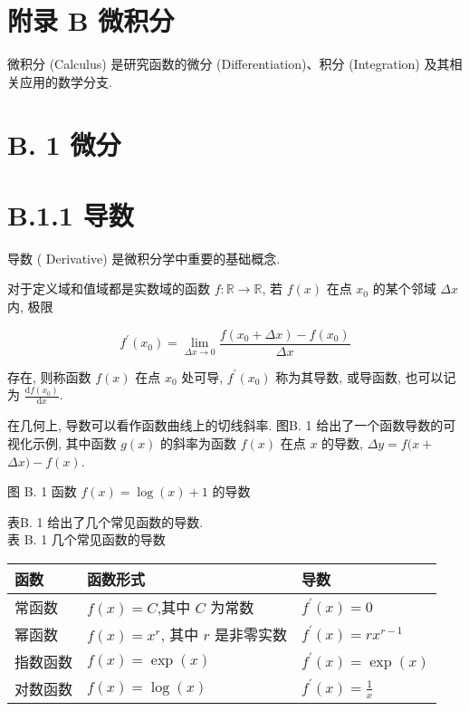 \documentclass[10pt]{article}
\begin{document}
\section*{附录 B 微积分}
微积分 (Calculus) 是研究函数的微分 (Differentiation)、积分 (Integration) 及其相关应用的数学分支.

\section*{B. 1 微分}
\section*{B.1.1 导数}
导数 ( Derivative) 是微积分学中重要的基础概念.

对于定义域和值域都是实数域的函数 $f: \mathbb{R} \rightarrow \mathbb{R}$, 若 $f(x)$ 在点 $x_{0}$ 的某个邻域 $\Delta x$ 内, 极限


\begin{equation*}
f^{\prime}\left(x_{0}\right)=\lim _{\Delta x \rightarrow 0} \frac{f\left(x_{0}+\Delta x\right)-f\left(x_{0}\right)}{\Delta x} \tag{B.1}
\end{equation*}


存在, 则称函数 $f(x)$ 在点 $x_{0}$ 处可导, $f^{\prime}\left(x_{0}\right)$ 称为其导数, 或导函数, 也可以记为 $\frac{\mathrm{d} f\left(x_{0}\right)}{\mathrm{d} x}$.

在几何上, 导数可以看作函数曲线上的切线斜率. 图B. 1 给出了一个函数导数的可视化示例, 其中函数 $g(x)$ 的斜率为函数 $f(x)$ 在点 $x$ 的导数, $\Delta y=f(x+$ $\Delta x)-f(x)$.



图 B. 1 函数 $f(x)=\log (x)+1$ 的导数

表B. 1 给出了几个常见函数的导数.\\
表 B. 1 几个常见函数的导数

\begin{center}
\begin{tabular}{lll}
\hline
函数 & 函数形式 & 导数 \\
\hline
常函数 & $f(x)=C$,其中 $C$ 为常数 & $f^{\prime}(x)=0$ \\
幂函数 & $f(x)=x^{r}$, 其中 $r$ 是非零实数 & $f^{\prime}(x)=r x^{r-1}$ \\
指数函数 & $f(x)=\exp (x)$ & $f^{\prime}(x)=\exp (x)$ \\
对数函数 & $f(x)=\log (x)$ & $f^{\prime}(x)=\frac{1}{x}$ \\
\hline
\end{tabular}
\end{center}
\end{document}
